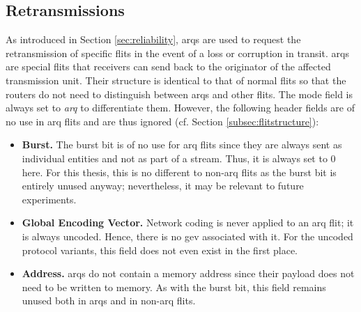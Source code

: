 \subsection{Retransmissions}\label{subsec:arqretransmissions}
As introduced in Section \ref{sec:reliability}, \glspl{arq} are used to request the retransmission of specific flits in the event of a loss or
corruption in transit. \Glspl{arq} are special flits that receivers can send back to the originator of the affected transmission unit. Their structure
is identical to that of normal flits so that the routers do not need to distinguish between \glspl{arq} and other flits. The mode field is always set
to \textit{\gls{arq}} to differentiate them. However, the following header fields are of no use in \gls{arq} flits and are thus ignored (cf. Section
\ref{subsec:flitstructure}):
\begin{itemize}
    \item \textbf{Burst.} The burst bit is of no use for \gls{arq} flits since they are always sent as individual entities and not as part of a stream.
        Thus, it is always set to 0 here. For this thesis, this is no different to non-\gls{arq} flits as the burst bit is entirely unused anyway;
        nevertheless, it may be relevant to future experiments.
    \item \textbf{Global Encoding Vector.} Network coding is never applied to an \gls{arq} flit; it is always uncoded. Hence, there is no \gls{gev}
        associated with it. For the uncoded protocol variants, this field does not even exist in the first place.
    \item \textbf{Address.} \Glspl{arq} do not contain a memory address since their payload does not need to be written to memory. As with the burst
        bit, this field remains unused both in \glspl{arq} and in non-\gls{arq} flits.
\end{itemize}
\vspace{0.5\baselineskip}

